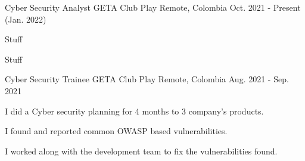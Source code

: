 

\begin{cventries}

  \cventry
    {Cyber Security Analyst} %
    {GETA Club Play} %
    {Remote, Colombia} %
    {Oct. 2021 - Present (Jan. 2022)} %
    {
      \begin{cvitems} %
        \item {Stuff}
        \item {Stuff}
      \end{cvitems}
    }

  \cventry
    {Cyber Security Trainee} %
    {GETA Club Play} %
    {Remote, Colombia} %
    {Aug. 2021 - Sep. 2021} %
    {
      \begin{cvitems} %
        \item {I did a Cyber security planning for 4 months to 3 company's products.}
        \item {I found and reported common OWASP based vulnerabilities.}
        \item {I worked along with the development team to fix the vulnerabilities found.}
      \end{cvitems}
    }


\end{cventries}

